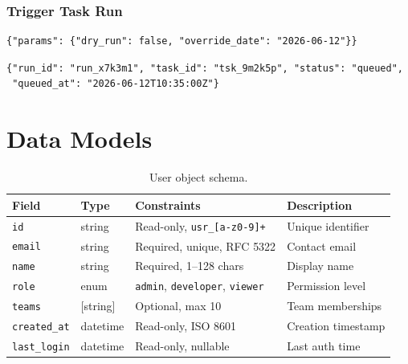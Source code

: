 \documentclass[
    language=english,
    doctype=article,
    institution=none,
]{../../omnilatex}
\begin{document}
\subsubsection{Trigger Task Run}
\begin{reqbox}
\begin{verbatim}
{"params": {"dry_run": false, "override_date": "2026-06-12"}}
\end{verbatim}
\end{reqbox}
\begin{resbox}[202 Accepted]
\begin{verbatim}
{"run_id": "run_x7k3m1", "task_id": "tsk_9m2k5p", "status": "queued",
 "queued_at": "2026-06-12T10:35:00Z"}
\end{verbatim}
\end{resbox}

\section{Data Models}
\label{sec:models}

\begin{table}[htbp]
    \centering
    \caption{User object schema.}
    \label{tab:user-schema}
    \begin{tabularx}{\textwidth}{@{}lllX@{}}
        \toprule
        \textbf{Field} & \textbf{Type} & \textbf{Constraints} & \textbf{Description} \\
        \midrule
        \texttt{id}          & string   & Read-only, \texttt{usr\_[a-z0-9]+} & Unique identifier \\
        \texttt{email}       & string   & Required, unique, RFC 5322 & Contact email \\
        \texttt{name}        & string   & Required, 1--128 chars & Display name \\
        \texttt{role}        & enum     & \texttt{admin}, \texttt{developer}, \texttt{viewer} & Permission level \\
        \texttt{teams}       & [string] & Optional, max 10 & Team memberships \\
        \texttt{created\_at} & datetime & Read-only, ISO 8601 & Creation timestamp \\
        \texttt{last\_login} & datetime & Read-only, nullable & Last auth time \\
        \bottomrule
    \end{tabularx}
\end{table}
\end{document}
